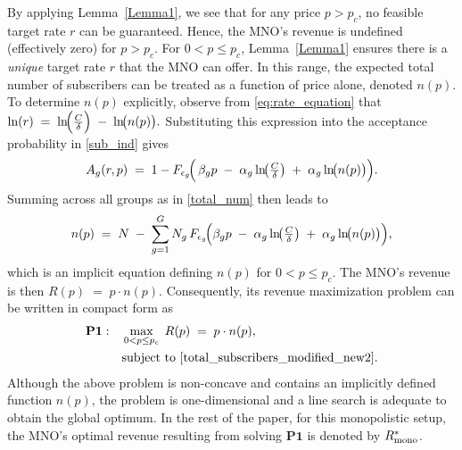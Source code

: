 \documentclass[12pt, draftclsnofoot, onecolumn]{IEEEtran}
\begin{document}
	By applying Lemma~\ref{Lemma1}, we see that for any price \(p > p_c\), no feasible 
	target rate \(r\) can be guaranteed. Hence, the MNO's revenue is undefined (effectively zero)
	for \(p > p_c\). For \(0 < p \leq p_c\), Lemma~\ref{Lemma1} ensures there is a \emph{unique} 
	target rate \(r\) that the MNO can offer. In this range, the expected total number of subscribers 
	can be treated as a function of price alone, denoted \(n(p)\).
	To determine \(n(p)\) explicitly, observe from \eqref{eq:rate_equation} that
	$\ln(r) 
	\;=\; \ln\!\Bigl(\tfrac{C}{\delta}\Bigr)
	\;-\; \ln\!\bigl(n(p)\bigr).$
	Substituting this expression into the acceptance probability 
	in \eqref{sub_ind} gives
	\[
	A_g(r,p) 
	\;=\; 1 
	- F_{\epsilon_g}\!\Bigl(\,\beta_g p 
	\;-\; \alpha_g \ln\!\bigl(\tfrac{C}{\delta}\bigr) 
	\;+\; \alpha_g \ln\!\bigl(n(p)\bigr)\Bigr).
	\]
	Summing across all groups as in \eqref{total_num} then leads to
	\begin{equation}
		n(p) 
		\;=\; N 
		\;-\; \sum_{g=1}^{G} N_g \,
		F_{\epsilon_g}\!\Bigl(\beta_g p
		\;-\;\alpha_g \ln\!\bigl(\tfrac{C}{\delta}\bigr)
		\;+\;\alpha_g \ln\!\bigl(n(p)\bigr)\Bigr),
		\label{total_subscribers_modified_new2}
	\end{equation}
	which is an implicit equation defining \(n(p)\) for \(0 < p \leq p_c\). 
	The MNO's revenue is then 
	\(\displaystyle R(p) \;=\; p\cdot n(p)\).
	Consequently, its revenue maximization problem can be written in 
	compact form as
	\begin{subequations}\label{total_eq}
		\renewcommand{\theequation}{\theparentequation-\alph{equation}}
		\begin{align}
			\mathbf{P1}:\quad
			&\max_{0 < p \leq p_c} \; R(p) \;=\; p \cdot n(p),
			\label{eq:revenue_maximization_problem2} \\
			&\text{subject to } \eqref{total_subscribers_modified_new2}.
			\label{eq:rate_constraint2}
		\end{align}
	\end{subequations}
	Although the above problem is non-concave and contains an implicitly defined function \( n(p) \), the problem is one-dimensional and a line search is adequate to obtain the global optimum. In the rest of the paper, for this monopolistic setup, the MNO's optimal revenue resulting from solving $\mathbf{P1}$ is denoted by $R^*_{\rm mono}$.
	
	
	
	
	
	
	
	
	
\end{document}
